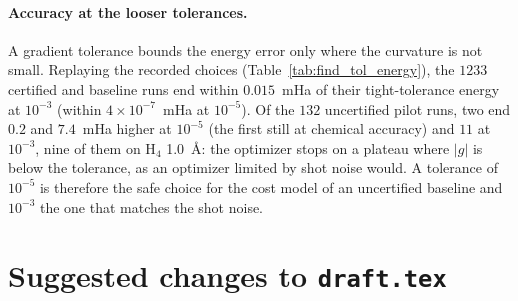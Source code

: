 \documentclass[11pt]{article}
\begin{document}
\paragraph{Accuracy at the looser tolerances.} A gradient tolerance bounds the energy error only where the curvature is not small. Replaying the recorded choices (Table~\ref{tab:find_tol_energy}), the $1233$ certified and baseline runs end within $0.015$~mHa of their tight-tolerance energy at $10^{-3}$ (within $4\times10^{-7}$~mHa at $10^{-5}$). Of the $132$ uncertified pilot runs, two end $0.2$ and $7.4$~mHa higher at $10^{-5}$ (the first still at chemical accuracy) and $11$ at $10^{-3}$, nine of them on H$_4$ 1.0~\AA: the optimizer stops on a plateau where $|g|$ is below the tolerance, as an optimizer limited by shot noise would.
A tolerance of $10^{-5}$ is therefore the safe choice for the cost model of an uncertified baseline and $10^{-3}$ the one that matches the shot noise.

\section{Suggested changes to \texttt{draft.tex}}\label{sec:draft}
\end{document}
